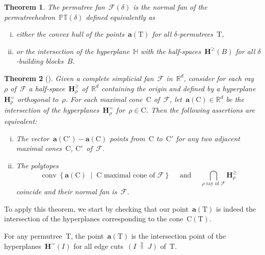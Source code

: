 \documentclass[10pt]{amsart}
\newtheorem{theorem}{Theorem}[section]
\theoremstyle{definition}\newtheorem{definition}[theorem]{Definition}\newtheorem{remark}[theorem]{Remark}\newtheorem{example}[theorem]{Example}
\newcommand{\R}{\mathbb{R}} %
\newcommand{\HH}{\mathbb{H}} %
\renewcommand{\b}[1]{\mathbf{#1}} %
\newcommand{\set}[2]{\left\{ #1 \;\middle|\; #2 \right\}} %
\newcommand{\tree}[1][T]{\mathrm{#1}} %
\newcommand{\decoration}{\delta} %
\newcommand{\edgecut}[2]{\left( #1 \;\middle\|\; #2 \right)} %
\newcommand{\Permutreehedron}[1][\decoration]{\mathds{PT}(#1)} %
\newcommand{\Cone}{\mathrm{C}} %
\newcommand{\fan}{\mathcal{F}} %
\newcommand{\Fan}[1][\decoration]{\fan(#1)} %
\newcommand{\Hyp}{\b{H}^=} %
\newcommand{\HS}{\b{H}^\ge} %
\DeclareMathOperator{\conv}{conv} %
\newcommand{\darkblue}{\color{darkblue}} %
\newcommand{\defn}[1]{\emph{\darkblue #1}} %
\begin{document}
\setcounter{theorem}{3}
\begin{theorem}
\label{theo:permutreehedra}
The permutree fan~$\Fan$ is the normal fan of the \defn{permutreehedron}~$\Permutreehedron$ defined equivalently as
\begin{enumerate}[(i)]
\item either the convex hull of the points~$\b{a}(\tree)$ for all $\decoration$-permutrees~$\tree$,
\item or the intersection of the hyperplane~$\HH$ with the half-spaces~$\HS(B)$ for all $\decoration$-building blocks~$B$.
\end{enumerate}
\end{theorem}
\begin{theorem}[]
\label{theo:HohlwegLangeThomas}
Given a complete simplicial fan~$\fan$ in~$\R^d$, consider for each ray~$\rho$ of~$\fan$ a half-space~$\HS_\rho$ of~$\R^d$ containing the origin and defined by a hyperplane~$\Hyp_\rho$ orthogonal to~$\rho$. For each maximal cone~$\Cone$ of~$\fan$, let~$\b{a}(\Cone) \in \R^d$ be the intersection of the hyperplanes~$\Hyp_\rho$ for~$\rho \in \Cone$. Then the following assertions are equivalent:
\begin{enumerate}[(i)]
\item The vector~$\b{a}(\Cone') - \b{a}(\Cone)$ points from~$\Cone$ to~$\Cone'$ for any two adjacent maximal cones~$\Cone$, $\Cone'$~of~$\fan$.
\item The polytopes
\[
\conv\set{\b{a}(\Cone)}{\Cone \text{ maximal cone of } \fan} \quad\text{ and }\quad
\bigcap_{\rho \text{ ray of } \fan} \HS_\rho
\]
coincide and their normal fan is~$\fan$.
\end{enumerate}
\end{theorem}
To apply this theorem, we start by checking that our point~$\b{a}(\tree)$ is indeed the intersection of the hyperplanes corresponding to the cone~$\Cone(\tree)$.

\begin{lemma}
\label{lem:intersectionPoint}
For any permutree~$\tree$, the point~$\b{a}(\tree)$ is the intersection point of the hyperplanes~$\Hyp(I)$ for all edge cuts~$\edgecut{I}{J}$ of~$\tree$.
\end{lemma}
\end{document}
